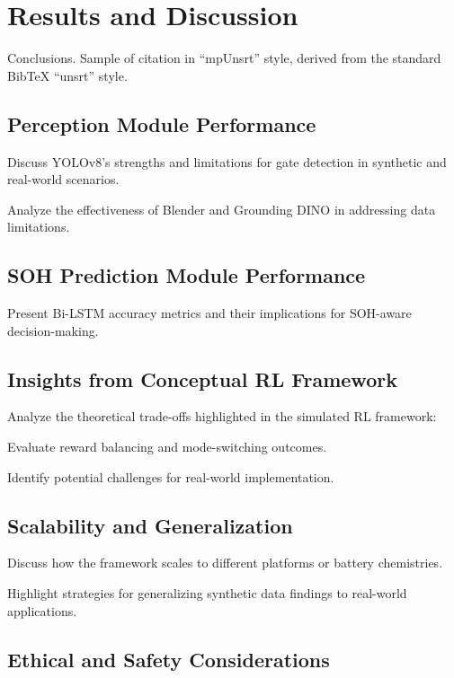 \chapter{Results and Discussion}\label{ch:6}
\minitoc

Conclusions. Sample of citation in ``mpUnsrt'' style, derived from the standard {Bib\TeX} ``unsrt'' style.

\newpage

\section{Perception Module Performance}

Discuss YOLOv8's strengths and limitations for gate detection in synthetic and real-world scenarios.


Analyze the effectiveness of Blender and Grounding DINO in addressing data limitations.


\section{SOH Prediction Module Performance}

Present Bi-LSTM accuracy metrics and their implications for SOH-aware decision-making.


\section{Insights from Conceptual RL Framework}

Analyze the theoretical trade-offs highlighted in the simulated RL framework:

Evaluate reward balancing and mode-switching outcomes.

Identify potential challenges for real-world implementation.


\section{Scalability and Generalization}

Discuss how the framework scales to different platforms or battery chemistries.

Highlight strategies for generalizing synthetic data findings to real-world applications.


\section{Ethical and Safety Considerations}

